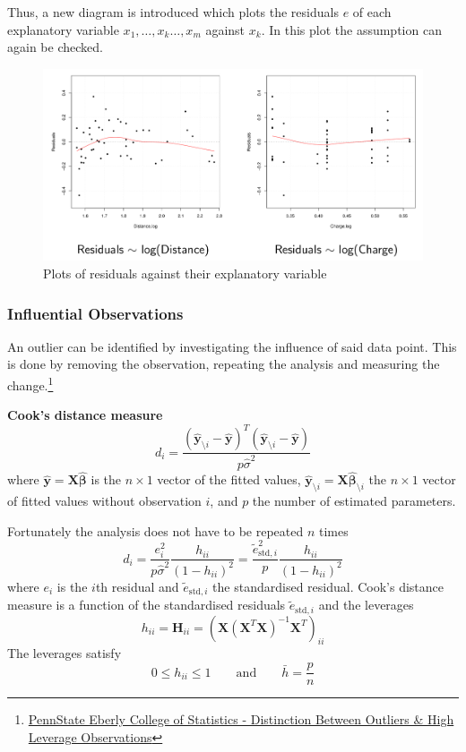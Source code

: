\documentclass[11pt]{article}
\theoremstyle{definition}
\begin{document}
Thus, a new diagram is introduced which plots the residuals $e$ of each explanatory variable $x_1,\dots,x_k\dots,x_m$ against $x_k$. In this plot the assumption can again be checked.
\begin{figure}[H]
	\centering
	\includegraphics[width=0.7\linewidth]{img/diagnostic_plots_residuals_explanatory}
	\caption{Plots of residuals against their explanatory variable}
	\label{fig:diagnosticplotsresidualsexplanatory}
\end{figure}

\subsubsection{Influential Observations}
An outlier can be identified by investigating the influence of said data point. This is done by removing the observation, repeating the analysis and measuring the change.\footnote{\href{https://online.stat.psu.edu/stat501/lesson/11/11.1}{PennState Eberly College of Statistics - Distinction Between Outliers \& High Leverage Observations}}

\vspace{1em}
\noindent
\textbf{Cook's distance measure}
\begin{equation*}
	d_i  = \frac{(\hat{\bm{y}}_{\setminus i} - \hat{\bm{y}})^T(\hat{\bm{y}}_{\setminus i} - \hat{\bm{y}})}{p\hat{\sigma}^2}
\end{equation*}
where $\hat{\bm{y}}=\bm{X}\hat{\bm{\beta}}$ is the $n\times1$ vector of the fitted values, $\hat{\bm{y}}_{\setminus i}=\bm{X}\hat{\bm{\beta}}_{\setminus i}$ the $n\times1$ vector of fitted values without observation $i$, and $p$ the number of estimated parameters.

Fortunately the analysis does not have to be repeated $n$ times
\begin{equation*}
	d_i = \frac{e_i^2}{p\hat{\sigma}^2}\frac{h_{ii}}{(1-h_{ii})^2} = \frac{\tilde{e}_{\text{std}, i}^2}{p}\frac{h_{ii}}{(1-h_{ii})^2}
\end{equation*}
where $e_i$ is the $i$th residual and $\tilde{e}_{\text{std},i}$ the standardised residual. Cook's distance measure is a function of the standardised residuals $\tilde{e}_{\text{std},i}$ and the leverages
\begin{equation*}
	h_{ii} = \bm{H}_{ii} = \left(\bm{X}\left(\bm{X}^T\bm{X}\right)^{-1}\bm{X}^T\right)_{ii}
\end{equation*}
The leverages satisfy
\begin{equation*}
	0\leq h_{ii}\leq 1\qquad\text{and}\qquad \bar{h} = \frac{p}{n}
\end{equation*}
\end{document}
